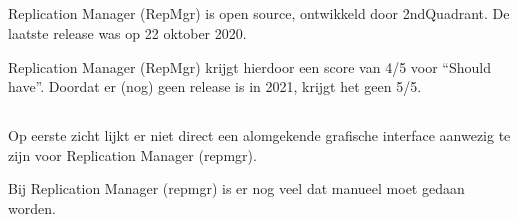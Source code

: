\subsubsection{}
\label{subsubsec:Replicatie}

\subsubsection{}
\label{subsubsec:Failover}

\subsubsection{}
\label{subsubsec:Monitoring}

\subsection{}
\label{subsec:Should have}

Replication Manager (RepMgr) is open source, ontwikkeld door 2ndQuadrant.
De laatste release was op 22 oktober 2020.

Replication Manager (RepMgr) krijgt hierdoor een score van 4/5 voor “Should have”. Doordat er (nog) geen release is in 2021, krijgt het geen 5/5.

\subsubsection{}
\label{subsubsec:Actieve ondersteuning in 2020-2021}

\subsubsection{}
\label{subsubsec:Open source}

\subsection{}
\label{subsec:Could have}

Op eerste zicht lijkt er niet direct een alomgekende grafische interface aanwezig te zijn voor Replication Manager (repmgr).

Bij Replication Manager (repmgr) is er nog veel dat manueel moet gedaan worden.

\subsubsection{}
\label{subsubsec:Grafische interface}

\subsubsection{}
\label{subsubsec:Beperkte manuele interventie}
